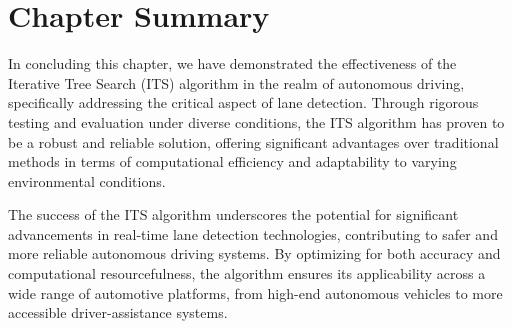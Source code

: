 \newpage
\newpage
\section{Chapter Summary}



In concluding this chapter, we have demonstrated the effectiveness of the Iterative Tree Search (ITS) algorithm in the realm of autonomous driving, specifically addressing the critical aspect of lane detection. Through rigorous testing and evaluation under diverse conditions, the ITS algorithm has proven to be a robust and reliable solution, offering significant advantages over traditional methods in terms of computational efficiency and adaptability to varying environmental conditions.

The success of the ITS algorithm underscores the potential for significant advancements in real-time lane detection technologies, contributing to safer and more reliable autonomous driving systems. By optimizing for both accuracy and computational resourcefulness, the algorithm ensures its applicability across a wide range of automotive platforms, from high-end autonomous vehicles to more accessible driver-assistance systems.



